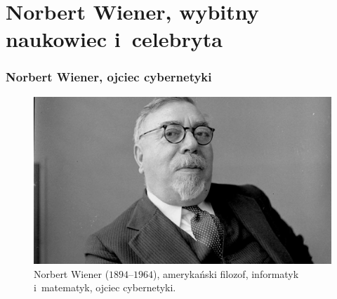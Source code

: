 \documentclass[10pt,t]{beamer}
\begin{document}
\section{Norbert Wiener, wybitny naukowiec i~celebryta}



\begin{frame}
  \frametitle{Norbert Wiener, ojciec cybernetyki}


  \begin{figure}

    \centering


    \includegraphics[scale=0.23]
    {./Presentation-pictures/Norbert-Wiener-01.jpg}


    \caption{
      {Norbert Wiener} ($1894\text{--}1964$), amerykański filozof,
      informatyk i~matematyk, ojciec cybernetyki.}


    \label{fig:Wiener-01}

  \end{figure}

\end{frame}
\end{document}
